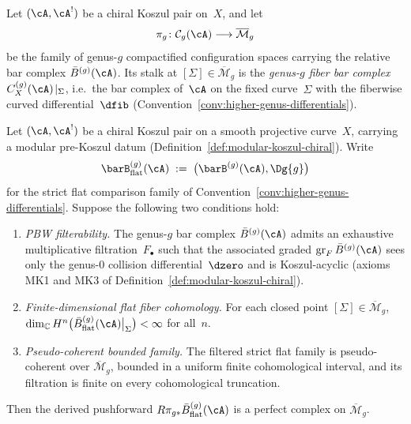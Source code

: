 \begin{definition}\label{def:relative-bar-fiber}
Let $(\cA, \cA^!)$ be a chiral Koszul pair on~$X$, and let
\[
\pi_g\colon \mathcal{C}_g(\cA) \longrightarrow
\overline{\mathcal{M}}_g
\]
be the family of genus-$g$ compactified configuration spaces
carrying the relative bar complex $\bar{B}^{(g)}(\cA)$.
Its stalk at $[\Sigma] \in \overline{\mathcal{M}}_g$ is the
\emph{genus-$g$ fiber bar complex}
$C^{(g)}_X(\cA)\!\mid_\Sigma$, i.e.\ the bar complex of~$\cA$
on the fixed curve~$\Sigma$ with the fiberwise curved
differential~$\dfib$
\textup{(}Convention~\textup{\ref{conv:higher-genus-differentials})}.
\end{definition}

\begin{lemma}
\label{lem:perfectness-criterion}
Let $(\cA, \cA^!)$ be a chiral Koszul pair on a smooth projective
curve~$X$, carrying a modular pre-Koszul datum
\textup{(}Definition~\textup{\ref{def:modular-koszul-chiral})}.
Write
\[
\barB^{(g)}_{\mathrm{flat}}(\cA)
\;:=\;
\bigl(\barB^{(g)}(\cA), \Dg{g}\bigr)
\]
for the strict flat comparison family of
Convention~\textup{\ref{conv:higher-genus-differentials}}.
Suppose the following two conditions hold:
\begin{enumerate}[label=\textup{(\roman*)}]
\item \emph{PBW filterability.}
 The genus-$g$ bar complex $\bar{B}^{(g)}(\cA)$ admits an
 exhaustive multiplicative filtration~$F_\bullet$ such that the
 associated graded $\operatorname{gr}_F \bar{B}^{(g)}(\cA)$
 sees only the genus-$0$ collision differential~$\dzero$ and is
 Koszul-acyclic \textup{(}axioms \textup{MK1} and
 \textup{MK3} of
 Definition~\textup{\ref{def:modular-koszul-chiral})}.

 \item \emph{Finite-dimensional flat fiber cohomology.}
 For each closed point
 $[\Sigma] \in \overline{\mathcal{M}}_g$,
 $\dim_\mathbb{C} H^n\bigl(
 \bar{B}^{(g)}_{\mathrm{flat}}(\cA)\big|_\Sigma\bigr)
 < \infty$ for all~$n$.

\item \emph{Pseudo-coherent bounded family.}
 The filtered strict flat family is pseudo-coherent over
 $\overline{\mathcal{M}}_g$, bounded in a uniform finite
 cohomological interval, and its filtration is finite on every
 cohomological truncation.
\end{enumerate}
Then the derived pushforward
$R\pi_{g*}\bar{B}^{(g)}_{\mathrm{flat}}(\cA)$ is a perfect complex on
$\overline{\mathcal{M}}_g$.
\end{lemma}

